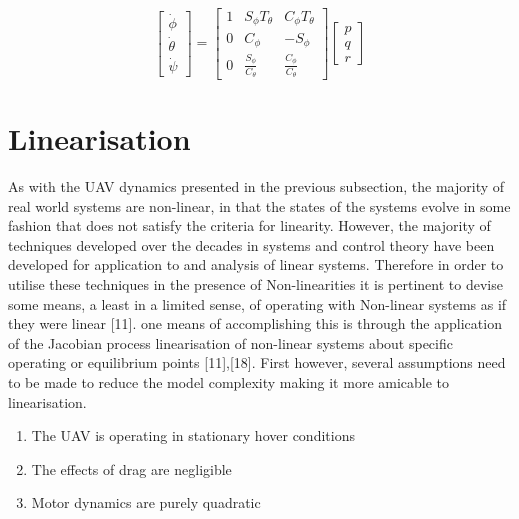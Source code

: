 \documentclass[12pt,a4paper,twoside]{report}
\begin{document}
			$$
				\begin{bmatrix}
				\dot{\phi} \\
				\dot{\theta} \\
				\dot{\psi}
				\end{bmatrix}
				=
				\begin{bmatrix}
				1 & S_\phi T_\theta & C_\phi T_\theta \\
				0 & C_\phi & -S_\phi\\
				0 & \frac{S_\phi}{C_\theta}  & \frac{C_\phi}{C_\theta}
				\end{bmatrix}
				\begin{bmatrix}
				p \\
				q \\
				r 
				\end{bmatrix}
			$$ 
		
		\newpage
		
		\section{Linearisation}
				
			As with the UAV dynamics presented in the previous subsection, the majority of real world systems are non-linear, in that the states of the systems evolve in some fashion that does not satisfy the criteria for linearity. However, the majority of techniques developed over the decades in systems and control theory have been developed for application to and analysis of linear systems. Therefore in order to utilise these techniques in the presence of Non-linearities it is pertinent to devise some means, a least in a limited sense, of operating with Non-linear systems as if they were linear [11]. one means of accomplishing this is through the application of the Jacobian process linearisation of non-linear systems about specific operating or equilibrium points [11],[18]. First however, several assumptions need to be made to reduce the model complexity making it more amicable to linearisation. 
				
			\begin{enumerate}
				\item 
					The UAV is operating in stationary hover conditions
				\item 
					The effects of drag are negligible
				\item 
					Motor dynamics are purely quadratic
			\end{enumerate}
\end{document}
